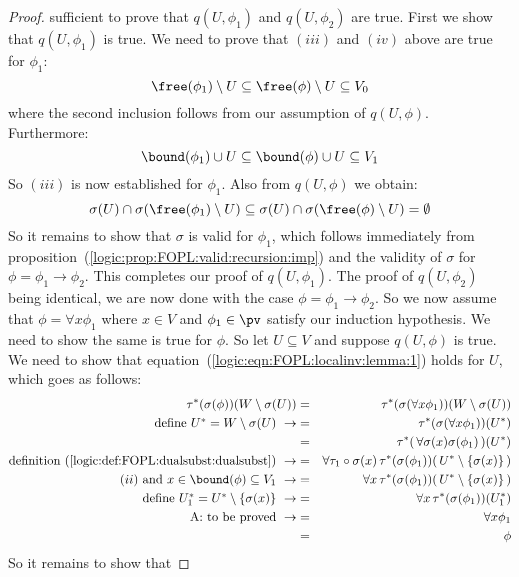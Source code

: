 \begin{proof}
sufficient to prove that $q(U,\phi_{1})$ and $q(U,\phi_{2})$ are
true. First we show that $q(U,\phi_{1})$ is true. We need to prove
that $(iii)$ and $(iv)$ above are true for $\phi_{1}$:
    \[
    \free(\phi_{1})\setminus U\subseteq\free(\phi)\setminus U\subseteq V_{0}
    \]
where the second inclusion follows from our assumption of
$q(U,\phi)$. Furthermore:
    \[
    \bound(\phi_{1})\cup U\subseteq\bound(\phi)\cup U\subseteq V_{1}
    \]
So $(iii)$ is now established for $\phi_{1}$. Also from $q(U,\phi)$
we obtain:
    \[
    \sigma(U)\cap\sigma(\free(\phi_{1})\setminus U)\subseteq
    \sigma(U)\cap\sigma(\free(\phi)\setminus U)=\emptyset
    \]
So it remains to show that $\sigma$ is valid for $\phi_{1}$, which
follows immediately from
proposition~(\ref{logic:prop:FOPL:valid:recursion:imp}) and the
validity of $\sigma$ for $\phi=\phi_{1}\to\phi_{2}$. This completes
our proof of $q(U,\phi_{1})$. The proof of $q(U,\phi_{2})$ being
identical, we are now done with the case $\phi=\phi_{1}\to\phi_{2}$.
So we now assume that $\phi=\forall x\phi_{1}$ where $x\in V$ and
$\phi_{1}\in\pv$ satisfy our induction hypothesis. We need to show
the same is true for $\phi$. So let $U\subseteq V$ and suppose
$q(U,\phi)$ is true. We need to show that
equation~(\ref{logic:eqn:FOPL:localinv:lemma:1}) holds for $U$,
which goes as follows:
    \begin{eqnarray*}
    \tau^{*}(\sigma(\phi))(W\setminus\sigma(U))&=&
    \tau^{*}(\sigma(\forall x\phi_{1}))(W\setminus\sigma(U))\\
    \mbox{define $U^{*}=W\setminus\sigma(U)$}\ \rightarrow
    &=&\tau^{*}(\sigma(\forall x\phi_{1}))(U^{*})\\
    &=&\tau^{*}(\,\forall\sigma(x)\sigma(\phi_{1})\,)(U^{*})\\
    \mbox{definition~(\ref{logic:def:FOPL:dualsubst:dualsubst})}\
    \rightarrow
    &=&\forall \tau_{1}\circ\sigma(x)\,\tau^{*}(
    \sigma(\phi_{1}))(\,U^{*}\setminus\{\sigma(x)\}\,)\\
    \mbox{$(ii)$ and $x\in\bound(\phi)\subseteq V_{1}$}\ \rightarrow
    &=&\forall x\,\tau^{*}(
    \sigma(\phi_{1}))(\,U^{*}\setminus\{\sigma(x)\}\,)\\
    \mbox{define $U_{1}^{*}=U^{*}\setminus\{\sigma(x)\}$}\ \rightarrow
    &=&\forall x\,\tau^{*}(\sigma(\phi_{1}))(U_{1}^{*})\\
    \mbox{A: to be proved}\ \rightarrow&=&\forall x\phi_{1}\\
    &=&\phi
    \end{eqnarray*}
So it remains to show that

\end{proof}
